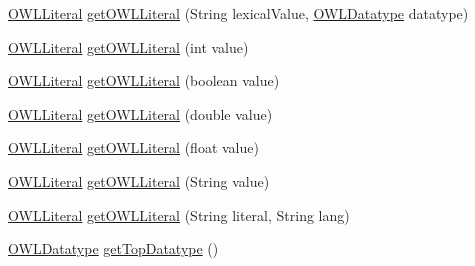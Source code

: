 \begin{DoxyCompactItemize}
\item 
\hyperlink{interfaceorg_1_1semanticweb_1_1owlapi_1_1model_1_1_o_w_l_literal}{O\-W\-L\-Literal} \hyperlink{interfaceuk_1_1ac_1_1manchester_1_1cs_1_1owl_1_1owlapi_1_1_o_w_l_data_factory_internals_a292da161fb87136be3f5dd1e203e7c5a}{get\-O\-W\-L\-Literal} (String lexical\-Value, \hyperlink{interfaceorg_1_1semanticweb_1_1owlapi_1_1model_1_1_o_w_l_datatype}{O\-W\-L\-Datatype} datatype)
\item 
\hyperlink{interfaceorg_1_1semanticweb_1_1owlapi_1_1model_1_1_o_w_l_literal}{O\-W\-L\-Literal} \hyperlink{interfaceuk_1_1ac_1_1manchester_1_1cs_1_1owl_1_1owlapi_1_1_o_w_l_data_factory_internals_afa559051e25b8176adbbc67981d07719}{get\-O\-W\-L\-Literal} (int value)
\item 
\hyperlink{interfaceorg_1_1semanticweb_1_1owlapi_1_1model_1_1_o_w_l_literal}{O\-W\-L\-Literal} \hyperlink{interfaceuk_1_1ac_1_1manchester_1_1cs_1_1owl_1_1owlapi_1_1_o_w_l_data_factory_internals_ab1ed5ba8c603f060610282766f887094}{get\-O\-W\-L\-Literal} (boolean value)
\item 
\hyperlink{interfaceorg_1_1semanticweb_1_1owlapi_1_1model_1_1_o_w_l_literal}{O\-W\-L\-Literal} \hyperlink{interfaceuk_1_1ac_1_1manchester_1_1cs_1_1owl_1_1owlapi_1_1_o_w_l_data_factory_internals_ac564c647b24799800a9194c1a888126f}{get\-O\-W\-L\-Literal} (double value)
\item 
\hyperlink{interfaceorg_1_1semanticweb_1_1owlapi_1_1model_1_1_o_w_l_literal}{O\-W\-L\-Literal} \hyperlink{interfaceuk_1_1ac_1_1manchester_1_1cs_1_1owl_1_1owlapi_1_1_o_w_l_data_factory_internals_a0baeb8c5738da59a2106c2a4d5babcac}{get\-O\-W\-L\-Literal} (float value)
\item 
\hyperlink{interfaceorg_1_1semanticweb_1_1owlapi_1_1model_1_1_o_w_l_literal}{O\-W\-L\-Literal} \hyperlink{interfaceuk_1_1ac_1_1manchester_1_1cs_1_1owl_1_1owlapi_1_1_o_w_l_data_factory_internals_ab5bbd6d50a6614e4c45b686cb0b9ffd0}{get\-O\-W\-L\-Literal} (String value)
\item 
\hyperlink{interfaceorg_1_1semanticweb_1_1owlapi_1_1model_1_1_o_w_l_literal}{O\-W\-L\-Literal} \hyperlink{interfaceuk_1_1ac_1_1manchester_1_1cs_1_1owl_1_1owlapi_1_1_o_w_l_data_factory_internals_a6ac80fd2a9f6475a491faab19ca7f49c}{get\-O\-W\-L\-Literal} (String literal, String lang)
\item 
\hyperlink{interfaceorg_1_1semanticweb_1_1owlapi_1_1model_1_1_o_w_l_datatype}{O\-W\-L\-Datatype} \hyperlink{interfaceuk_1_1ac_1_1manchester_1_1cs_1_1owl_1_1owlapi_1_1_o_w_l_data_factory_internals_a89825758d3e4e82b9f47696f7f321da0}{get\-Top\-Datatype} ()

\end{DoxyCompactItemize}
